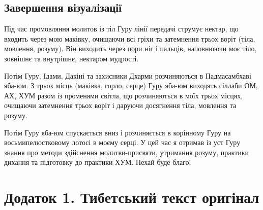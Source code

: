 \documentclass{article}
\begin{document}
\subsection{Завершення візуалізації}

Під час промовляння молитов із тіл Гуру лінії передачі струмує нектар, що
входить через мою маківку, очищаючи всі гріхи та затемнення трьох воріт
(тіла, мовлення, розуму). Він виходить через пори ніг і пальців, наповнюючи
моє тіло, зовнішнє та внутрішнє, нектаром мудрості.

Потім Гуру, Ідами, Дакіні та захисники Дхарми розчиняються в Падмасамбхаві
яба-юм. З трьох місць (маківка, горло, серце) Гуру яба-юм виходять сіллаби
ОМ, АХ, ХУМ разом із променями світла, що розчиняються в моїх трьох місцях,
очищаючи затемнення трьох воріт і даруючи досягнення тіла, мовлення та розуму.

Потім Гуру яба-юм спускається вниз і розчиняється в корінному Гуру на
восьмипелюстковому лотосі в моєму серці. У цей час я отримав із уст Гуру
знання про методи здійснення молитви-присвяти, утримання розуму,
практики дихання та підготовку до практики ХУМ. Нехай буде благо!

\section{Додаток 1. Тибетський текст оригінал}
\end{document}
